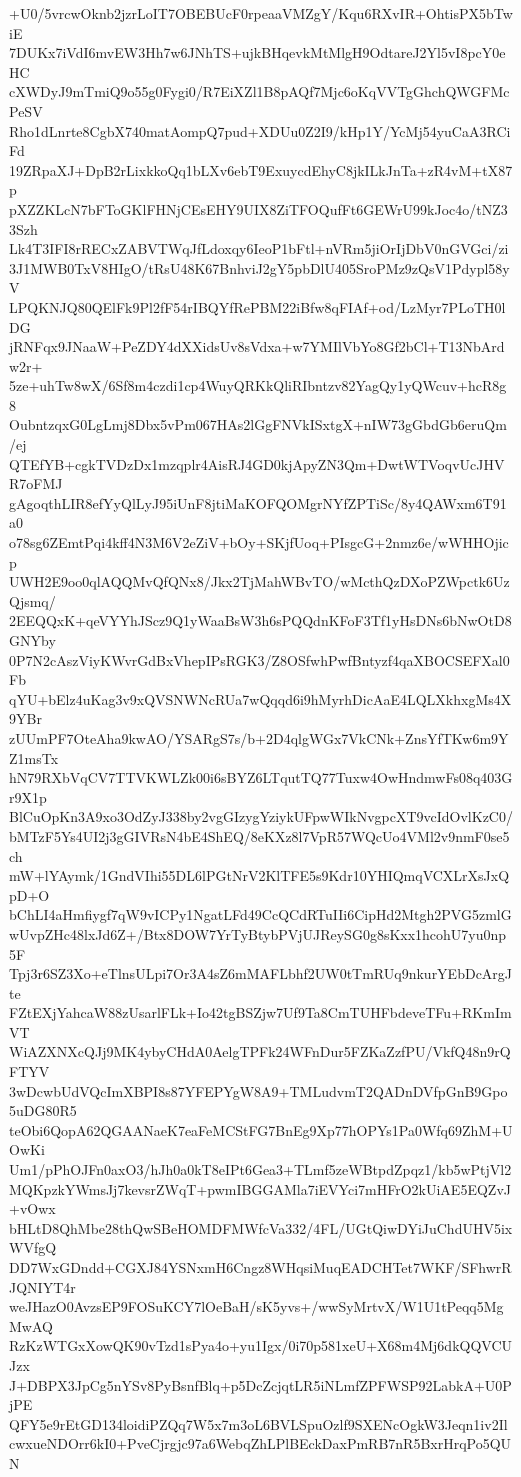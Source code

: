 +U0/5vrcwOknb2jzrLoIT7OBEBUcF0rpeaaVMZgY/Kqu6RXvIR+OhtisPX5bTwiE
7DUKx7iVdI6mvEW3Hh7w6JNhTS+ujkBHqevkMtMlgH9OdtareJ2Yl5vI8pcY0eHC
cXWDyJ9mTmiQ9o55g0Fygi0/R7EiXZl1B8pAQf7Mjc6oKqVVTgGhchQWGFMcPeSV
Rho1dLnrte8CgbX740matAompQ7pud+XDUu0Z2I9/kHp1Y/YcMj54yuCaA3RCiFd
19ZRpaXJ+DpB2rLixkkoQq1bLXv6ebT9ExuycdEhyC8jkILkJnTa+zR4vM+tX87p
pXZZKLcN7bFToGKlFHNjCEsEHY9UIX8ZiTFOQufFt6GEWrU99kJoc4o/tNZ33Szh
Lk4T3IFI8rRECxZABVTWqJfLdoxqy6IeoP1bFtl+nVRm5jiOrIjDbV0nGVGci/zi
3J1MWB0TxV8HIgO/tRsU48K67BnhviJ2gY5pbDlU405SroPMz9zQsV1Pdypl58yV
LPQKNJQ80QElFk9Pl2fF54rIBQYfRePBM22iBfw8qFIAf+od/LzMyr7PLoTH0lDG
jRNFqx9JNaaW+PeZDY4dXXidsUv8sVdxa+w7YMIlVbYo8Gf2bCl+T13NbArdw2r+
5ze+uhTw8wX/6Sf8m4czdi1cp4WuyQRKkQliRIbntzv82YagQy1yQWcuv+hcR8g8
OubntzqxG0LgLmj8Dbx5vPm067HAs2lGgFNVkISxtgX+nIW73gGbdGb6eruQm/ej
QTEfYB+cgkTVDzDx1mzqplr4AisRJ4GD0kjApyZN3Qm+DwtWTVoqvUcJHVR7oFMJ
gAgoqthLIR8efYyQlLyJ95iUnF8jtiMaKOFQOMgrNYfZPTiSc/8y4QAWxm6T91a0
o78sg6ZEmtPqi4kff4N3M6V2eZiV+bOy+SKjfUoq+PIsgcG+2nmz6e/wWHHOjicp
UWH2E9oo0qlAQQMvQfQNx8/Jkx2TjMahWBvTO/wMcthQzDXoPZWpctk6UzQjsmq/
2EEQQxK+qeVYYhJScz9Q1yWaaBsW3h6sPQQdnKFoF3Tf1yHsDNs6bNwOtD8GNYby
0P7N2cAszViyKWvrGdBxVhepIPsRGK3/Z8OSfwhPwfBntyzf4qaXBOCSEFXal0Fb
qYU+bElz4uKag3v9xQVSNWNcRUa7wQqqd6i9hMyrhDicAaE4LQLXkhxgMs4X9YBr
zUUmPF7OteAha9kwAO/YSARgS7s/b+2D4qlgWGx7VkCNk+ZnsYfTKw6m9YZ1msTx
hN79RXbVqCV7TTVKWLZk00i6sBYZ6LTqutTQ77Tuxw4OwHndmwFs08q403Gr9X1p
BlCuOpKn3A9xo3OdZyJ338by2vgGIzygYziykUFpwWIkNvgpcXT9vcIdOvlKzC0/
bMTzF5Ys4UI2j3gGIVRsN4bE4ShEQ/8eKXz8l7VpR57WQcUo4VMl2v9nmF0se5ch
mW+lYAymk/1GndVIhi55DL6lPGtNrV2KlTFE5s9Kdr10YHIQmqVCXLrXsJxQpD+O
bChLI4aHmfiygf7qW9vICPy1NgatLFd49CcQCdRTuIIi6CipHd2Mtgh2PVG5zmlG
wUvpZHc48lxJd6Z+/Btx8DOW7YrTyBtybPVjUJReySG0g8sKxx1hcohU7yu0np5F
Tpj3r6SZ3Xo+eTlnsULpi7Or3A4sZ6mMAFLbhf2UW0tTmRUq9nkurYEbDcArgJte
FZtEXjYahcaW88zUsarlFLk+Io42tgBSZjw7Uf9Ta8CmTUHFbdeveTFu+RKmImVT
WiAZXNXcQJj9MK4ybyCHdA0AelgTPFk24WFnDur5FZKaZzfPU/VkfQ48n9rQFTYV
3wDcwbUdVQcImXBPI8s87YFEPYgW8A9+TMLudvmT2QADnDVfpGnB9Gpo5uDG80R5
teObi6QopA62QGAANaeK7eaFeMCStFG7BnEg9Xp77hOPYs1Pa0Wfq69ZhM+UOwKi
Um1/pPhOJFn0axO3/hJh0a0kT8eIPt6Gea3+TLmf5zeWBtpdZpqz1/kb5wPtjVl2
MQKpzkYWmsJj7kevsrZWqT+pwmIBGGAMla7iEVYci7mHFrO2kUiAE5EQZvJ+vOwx
bHLtD8QhMbe28thQwSBeHOMDFMWfcVa332/4FL/UGtQiwDYiJuChdUHV5ixWVfgQ
DD7WxGDndd+CGXJ84YSNxmH6Cngz8WHqsiMuqEADCHTet7WKF/SFhwrRJQNIYT4r
weJHazO0AvzsEP9FOSuKCY7lOeBaH/sK5yvs+/wwSyMrtvX/W1U1tPeqq5MgMwAQ
RzKzWTGxXowQK90vTzd1sPya4o+yu1Igx/0i70p581xeU+X68m4Mj6dkQQVCUJzx
J+DBPX3JpCg5nYSv8PyBsnfBlq+p5DcZcjqtLR5iNLmfZPFWSP92LabkA+U0PjPE
QFY5e9rEtGD134loidiPZQq7W5x7m3oL6BVLSpuOzlf9SXENcOgkW3Jeqn1iv2Il
cwxueNDOrr6kI0+PveCjrgjc97a6WebqZhLPlBEckDaxPmRB7nR5BxrHrqPo5QUN
